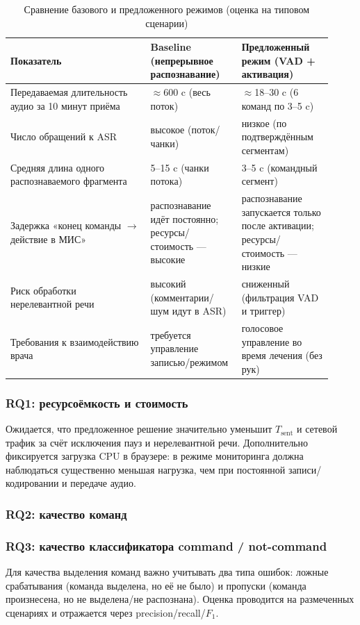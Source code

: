 \begin{table}[t]
    \centering
    \caption{Сравнение базового и предложенного режимов (оценка на типовом сценарии)}
    \label{tab:exp_results}
    \begin{tabular}{|p{0.40\linewidth}|p{0.26\linewidth}|p{0.26\linewidth}|}
    \hline
    \textbf{Показатель} & \textbf{Baseline (непрерывное распознавание)} & \textbf{Предложенный режим (VAD + активация)} \\
    \hline
    Передаваемая длительность аудио за 10 минут приёма & $\approx$600 c (весь поток) & $\approx$18--30 c (6 команд по 3--5 c) \\
    \hline
    Число обращений к ASR & высокое (поток/чанки) & низкое (по подтверждённым сегментам) \\
    \hline
    Средняя длина одного распознаваемого фрагмента & 5--15 c (чанки потока) & 3--5 c (командный сегмент) \\
    \hline
    Задержка «конец команды $\rightarrow$ действие в МИС» & распознавание идёт постоянно; ресурсы/стоимость — высокие & распознавание запускается только после активации; ресурсы/стоимость — низкие \\
    \hline
    Риск обработки нерелевантной речи & высокий (комментарии/шум идут в ASR) & сниженный (фильтрация VAD и триггер) \\
    \hline
    Требования к взаимодействию врача & требуется управление записью/режимом & голосовое управление во время лечения (без рук) \\
    \hline
    \end{tabular}
    \end{table}

\subsubsection{RQ1: ресурсоёмкость и стоимость}
Ожидается, что предложенное решение значительно уменьшит $T_{\text{sent}}$ и сетевой трафик за счёт исключения пауз и нерелевантной речи.
Дополнительно фиксируется загрузка CPU в браузере: в режиме мониторинга должна наблюдаться существенно меньшая нагрузка, чем при постоянной записи/кодировании и передаче аудио.

\subsubsection{RQ2: качество команд}

\subsubsection{RQ3: качество классификатора command / not-command}
Для качества выделения команд важно учитывать два типа ошибок: ложные срабатывания (команда выделена, но её не было) и пропуски (команда произнесена, но не выделена/не распознана).
Оценка проводится на размеченных сценариях и отражается через precision/recall/$F_1$.

